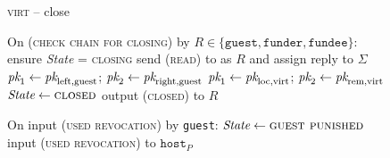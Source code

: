 \begin{figure}[H]
\begin{processbox}{\textsc{virt} -- close}
\begin{algorithmic}[1]
      \State On (\textsc{check chain for closing}) by $R \in \{\texttt{guest},
      \texttt{funder}, \texttt{fundee}\}$:
      \Indent
        \State ensure \textit{State} = \textsc{closing}
        \State send (\textsc{read}) to \ledger as $R$ and assign reply to
        $\Sigma$
          \State $\textit{pk}_{1} \gets \textit{pk}_{\mathrm{left}, \mathrm{guest}}$; $\textit{pk}_{2}
          \gets \textit{pk}_{\mathrm{right}, \mathrm{guest}}$
        \Else \: 
          \State $\textit{pk}_{1} \gets \textit{pk}_{\mathrm{loc}, \mathrm{virt}}$; $\textit{pk}_{2} \gets
          \textit{pk}_{\mathrm{rem}, \mathrm{virt}}$
        \EndIf
         
          \State $\textit{State} \gets \textsc{closed}$
          \State output (\textsc{closed}) to $R$
        \EndIf
      \EndIndent
      \Statex

      \State On input (\textsc{used revocation}) by \texttt{guest}:
      \Indent
        \State $\textit{State} \gets \textsc{guest punished}$
        \State input (\textsc{used revocation}) to $\texttt{host}_P$
      \EndIndent
    \end{algorithmic}
  \end{processbox}
  \caption{}
  \label{code:virtual-layer:close}
\end{figure}
